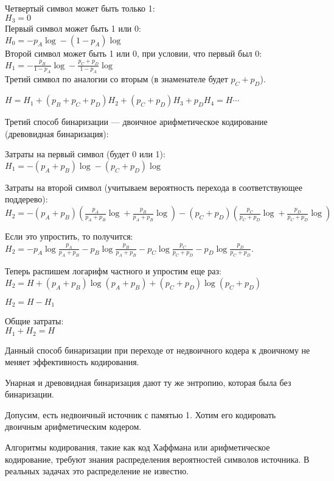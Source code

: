 {Четвертый символ может быть только 1:\\
$H_3 = 0$\\

Первый символ может быть 1 или 0:\\
$H_0 = -p_A \log - (1 - p_A) \log$\\

Второй символ может быть 1 или 0, при условии, что первый был 0:\\
$H_1 = -\frac{p_B}{1 - p_A} \log - \frac{p_C + p_D}{1 - p_A} \log$\\

Третий символ по аналогии со вторым (в знаменателе будет $p_C + p_D$).

$H = H_1 + (p_B + p_C + p_D) H_2 + (p_C + p_D) H_3 + p_D H_4 = H \cdots$

Третий способ бинаризации --- двоичное арифметическое кодирование (древовидная
бинаризация):


Затраты на первый символ (будет 0 или 1):\\
$H_1 = -(p_A + p_B) \log - (p_C + p_D) \log$

Затраты на второй символ (учитываем вероятность перехода в соответствующее
поддерево):\\
$H_2 = -(p_A + p_B)(\frac{p_A}{p_A + p_B} \log + \frac{p_B}{p_A + p_B} \log)
- (p_C + p_D)(\frac{p_C}{p_C + p_D} \log + \frac{p_D}{p_C + p_D} \log)$

Если это упростить, то получится:
$H_2 = -p_A \log \frac{p_A}{p_A + p_B} - p_B \log \frac{p_B}{p_A + p_B}
- p_C \log \frac{p_C}{p_C + p_D} - p_D \log \frac{p_D}{p_C + p_D}$.

Теперь распишем логарифм частного и упростим еще раз:
$H_2 = H + (p_A + p_B) \log(p_A + p_B) + (p_C + p_D) \log(p_C + p_D)$

$H_2 = H - H_1$

Общие затраты:\\
$H_1 + H_2 = H$

Данный способ бинаризации при переходе от недвоичного кодера к двоичному не
меняет эффективность кодирования.

Унарная и древовидная бинаризация дают ту же энтропию, которая была без
бинаризации.

Допусим, есть недвоичный источник с памятью 1. Хотим его кодировать двоичным
арифметическим кодером. 

Алгоритмы кодирования, такие как код Хаффмана или арифметическое кодирование,
требуют знания распределения вероятностей символов источника. В реальных
задачах это распределение не известно.

}
